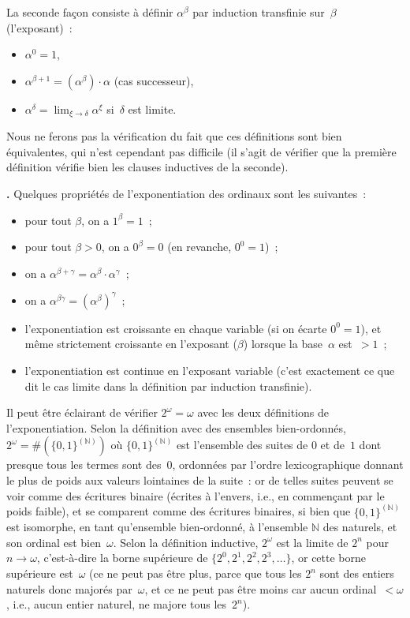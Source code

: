 \documentclass[12pt,a4paper]{article}
\theoremstyle{definition}
\newcommand\thingy{%
\refstepcounter{comcnt}\smallskip\noindent\textbf{\thecomcnt.} }
\begin{document}
La seconde façon consiste à définir $\alpha^\beta$ par induction
transfinie sur $\beta$ (l'exposant) :
\begin{itemize}
\item $\alpha ^ 0 = 1$,
\item $\alpha ^ {\beta+1} = (\alpha^\beta) \cdot \alpha$ (cas successeur),
\item $\alpha ^ \delta = \lim_{\xi\to\delta} \alpha^\xi$
  si $\delta$ est limite.
\end{itemize}

Nous ne ferons pas la vérification du fait que ces définitions sont
bien équivalentes, qui n'est cependant pas difficile (il s'agit de
vérifier que la première définition vérifie bien les clauses
inductives de la seconde).

\thingy Quelques propriétés de l'exponentiation des ordinaux sont les
suivantes :
\begin{itemize}
\item pour tout $\beta$, on a $1^\beta = 1$ ;
\item pour tout $\beta>0$, on a $0^\beta = 0$ (en revanche, $0^0=1$) ;
\item on a $\alpha^{\beta+\gamma} = \alpha^\beta \cdot \alpha^\gamma$ ;
\item on a $\alpha^{\beta\gamma} = (\alpha^\beta)^\gamma$ ;
\item l'exponentiation est croissante en chaque variable (si on écarte
  $0^0 = 1$), et même strictement croissante en l'exposant ($\beta$)
  lorsque la base $\alpha$ est $>1$ ;
\item l'exponentiation est continue en l'exposant variable (c'est
  exactement ce que dit le cas limite dans la définition par induction
  transfinie).
\end{itemize}

Il peut être éclairant de vérifier $2^\omega = \omega$ avec les deux
définitions de l'exponentiation.  Selon la définition avec des
ensembles bien-ordonnés, $2^\omega = \#(\{0,1\}^{(\mathbb{N})})$ où
$\{0,1\}^{(\mathbb{N})}$ est l'ensemble des suites de $0$ et de $1$
dont presque tous les termes sont des $0$, ordonnées par l'ordre
lexicographique donnant le plus de poids aux valeurs lointaines de la
suite : or de telles suites peuvent se voir comme des écritures
binaire (écrites à l'envers, i.e., en commençant par le poids faible),
et se comparent comme des écritures binaires, si bien que
$\{0,1\}^{(\mathbb{N})}$ est isomorphe, en tant qu'ensemble
bien-ordonné, à l'ensemble $\mathbb{N}$ des naturels, et son ordinal
est bien $\omega$.  Selon la définition inductive, $2^\omega$ est la
limite de $2^n$ pour $n\to\omega$, c'est-à-dire la borne supérieure de
$\{2^0,2^1,2^2,2^3,\ldots\}$, or cette borne supérieure est $\omega$
(ce ne peut pas être plus, parce que tous les $2^n$ sont des entiers
naturels donc majorés par $\omega$, et ce ne peut pas être moins car
aucun ordinal $<\omega$, i.e., aucun entier naturel, ne majore tous
les $2^n$).
\end{document}
